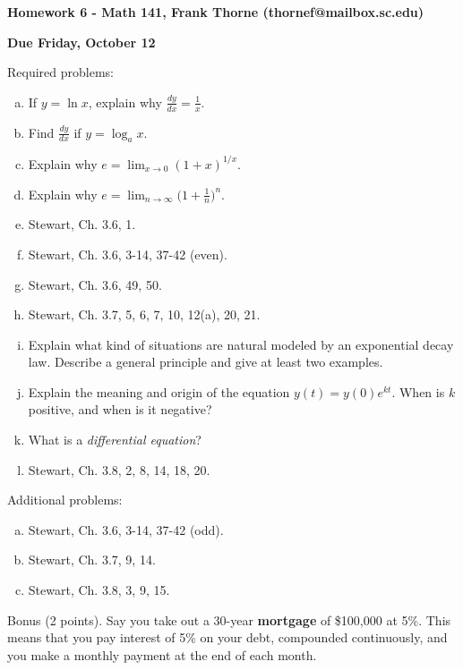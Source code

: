 \documentclass[12pt]{article}
\begin{document}
\setlength{\topmargin}{-2mm}





\begin{center}{\bf Homework 6 - Math 141, Frank Thorne (thornef@mailbox.sc.edu)}
\end{center}
\begin{center}
{\bf Due Friday, October 12}
\end{center}
Required problems:
\begin{enumerate}[(a)]

\item
If $y = \ln x$, explain why $\frac{dy}{dx} = \frac{1}{x}$.

\item
Find $\frac{dy}{dx}$ if $y = \log_a x$.

\item
Explain why $e = \lim_{x \rightarrow 0} (1 + x)^{1/x}.$

\item
Explain why $e = \lim_{n \rightarrow \infty} \bigg(1 + \frac{1}{n} \bigg)^n.$

\item
Stewart, Ch. 3.6, 1.

\item
Stewart, Ch. 3.6, 3-14, 37-42 (even).

\item
Stewart, Ch. 3.6, 49, 50.

\item
Stewart, Ch. 3.7, 5, 6, 7, 10, 12(a), 20, 21.

\item
Explain what kind of situations are natural modeled by an exponential
decay law. Describe a general principle and give at least two examples.

\item
Explain the meaning and origin of the equation $y(t) = y(0) e^{kt}$.
When is $k$ positive, and when is it negative?

\item
What is a {\itshape differential equation}?

\item
Stewart, Ch. 3.8, 2, 8, 14, 18, 20.

\end{enumerate}
Additional problems:
\begin{enumerate}[(a)]
\item
Stewart, Ch. 3.6, 3-14, 37-42 (odd).

\item
Stewart, Ch. 3.7, 9, 14.

\item
Stewart, Ch. 3.8, 3, 9, 15.

\end{enumerate}
Bonus (2 points). Say you take out a 30-year 
{\bf mortgage} of \$100,000 at 5\%. This means that you pay
interest of 5\% on your debt, compounded continuously, and you make
a monthly payment at the end of each month.
\end{document}
